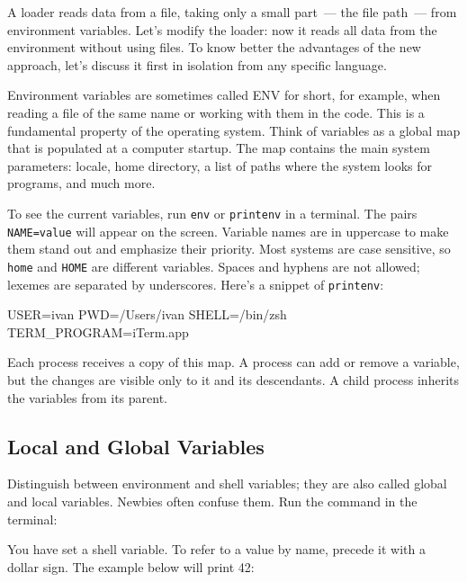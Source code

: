 
A loader reads data from a file, taking only a small part~--- the file path~--- from environment variables. Let's modify the loader: now it reads all data from the environment without using files. To know better the advantages of the new approach, let's discuss it first in isolation from any specific language.


Environment variables are sometimes called ENV for short, for example, when reading a file of the same name or working with them in the code. This is a fundamental property of the operating system. Think of variables as a global map that is populated at a computer startup. The map contains the main system parameters: locale, home directory, a list of paths where the system looks for programs, and much more.

To see the current variables, run \verb|env| or \verb|printenv| in a terminal. The pairs \verb|NAME=value| will appear on the screen. Variable names are in uppercase to make them stand out and emphasize their priority. Most systems are case sensitive, so \verb|home| and \verb|HOME| are different variables. Spaces and hyphens are not allowed; lexemes are separated by underscores. Here's a snippet of \verb|printenv|:

\begin{bash}
USER=ivan
PWD=/Users/ivan
SHELL=/bin/zsh
TERM_PROGRAM=iTerm.app
\end{bash}

Each process receives a copy of this map. A process can add or remove a variable, but the changes are visible only to it and its descendants. A child process inherits the variables from its parent.

\subsection{Local and Global Variables}


Distinguish between environment and shell variables; they are also called global and local variables. Newbies often confuse them. Run the command in the terminal:


You have set a shell variable. To refer to a value by name, precede it with a dollar sign. The example below will print 42:

